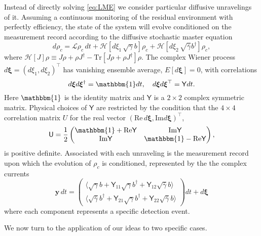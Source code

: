 \documentclass[%
preprint,
onecolumn,
notitlepag,
 amsmath,amssymb,
 aps,
 pra,
]{revtex4-2}
\newcommand{\be}{\begin{equation}}
\newcommand{\ee}{\end{equation}}
\newcommand{\tr}{\mbox{Tr}}
\begin{document}
Instead of directly solving \eqref{eq:LME} we consider particular diffusive unravelings of it. Assuming a continuous monitoring of the residual environment with perfectly efficiency, the state of the system will evolve conditioned on the measurement record according to the diffusive stochastic master equation
\begin{equation}
d\rho_{c} = \mathcal{L}\rho_{c} \, dt +  \mathcal{H}[d\xi_{1}\,\sqrt{\gamma} b] \rho_{c} +  \mathcal{H}[d\xi_{2}\, \sqrt{\bar{\gamma}} b^{\dag}] \rho_{c},
\end{equation} 
where $\mathcal{H}[J] \rho \equiv  J \rho + \rho J^{\dag} - \tr [J \rho + \rho J^{\dag}] \rho$.  The complex Wiener process $d\boldsymbol{\xi} = (d\xi_{1}, d\xi_{2})^{\top}$ has vanishing ensemble average, $E[d\boldsymbol{\xi}] = 0$, with correlations 
\begin{equation}
d\boldsymbol{\xi} d\boldsymbol{\xi}^{\dag} = \mathbbm{1} dt, \quad  d\boldsymbol{\xi} d\boldsymbol{\xi}^{\top} = \mathsf{Y} dt.
\end{equation}
Here $\mathbbm{1}$ is the identity matrix and $\mathsf{Y}$ is a $2 \times 2$ complex symmetric matrix. Physical choices of $\mathsf{Y}$ are restricted by the condition that the $4 \times 4$ correlation matrix $U$ for the real vector $(\text{Re}\, d\boldsymbol{\xi} ,\text{Im} d\boldsymbol{\xi} )^{\top}$,
\be
\mathsf{U} = \frac{1}{2} \begin{pmatrix} \mathbbm{1} + \mathrm{Re}\mathsf{Y} & \mathrm{Im}\mathsf{Y}  \\ \mathrm{Im}\mathsf{Y} & \mathbbm{1} - \mathrm{Re}\mathsf{Y}  \end{pmatrix},
\ee
is positive definite. Associated with each unraveling is the measurement record upon which the evolution of $\rho_{c}$ is conditioned,  represented by the  the complex currents
\begin{equation}
\mathbf{y} \, dt  = 
\begin{pmatrix}
\langle \sqrt{\gamma}b + \mathsf{Y}_{11} \sqrt{\gamma}b^{\dag} +  \mathsf{Y}_{12} \sqrt{\bar{\gamma}} b \rangle \\
\langle \sqrt{\bar{\gamma}}b^{\dag} + \mathsf{Y}_{21} \sqrt{\gamma}b^{\dag} +  \mathsf{Y}_{22} \sqrt{\bar{\gamma}} b \rangle
\end{pmatrix} dt +
 d\boldsymbol{\xi}
\end{equation}
where each component represents a specific detection event.

We now turn to the application of our ideas to two specific cases.
\end{document}
